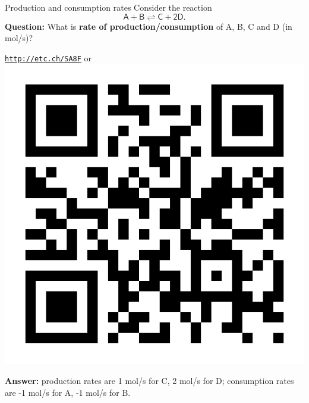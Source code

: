 \begin{frame}{Production and consumption rates}
	\vskip 10pt
Consider the reaction
	\[
	\mathsf{A+B\rightleftharpoons C+2D.}
	\]
%
\alert{\textbf{Question:}}  What is \textbf{rate of production\slash consumption}
of A, B, C and D (in mol/s)? \\
\begin{center}{ \href{http://etc.ch/SA8F}{\textcolor{indigo(dye)}{\tt http://etc.ch/SA8F}}} \quad
or \quad
\includegraphics[height=0.25\columnwidth]{figures/intro/poll-python-background.png}
\end{center}
\hiddenpause
\textbf{Answer:} production rates are 1 mol/s for C, 2 mol/s for D; consumption rates are -1 mol/s for A, -1 mol/s for B. 
\end{frame}
%
